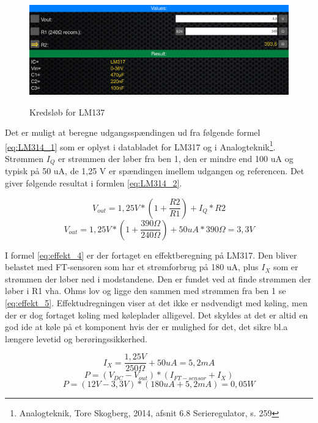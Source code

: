 \begin{figure}[H] \centering
{\includegraphics[width=\textwidth]{filer/design/Billeder/LM317_calc}}
\caption{Kredsløb for LM137}
\label{lab:LM317_calc}
\raggedright
\end{figure}

Det er muligt at beregne udgangsspændingen ud fra følgende formel \ref{eq:LM314_1} som er oplyst i databladet for LM317 og i Analogteknik\footnote{Analogteknik, Tore Skogberg, 2014, afsnit 6.8 Serieregulator, s. 259}. Strømmen $I_Q$ er strømmen der løber fra ben 1, den er mindre end 100 uA og typisk på 50 uA, de 1,25 V er spændingen imellem udgangen og referencen. Det giver følgende resultat i formlen \ref{eq:LM314_2}. 

\begin{equation} 
V_{out} = 1,25 V*(1+\frac{R2}{R1})+I_Q*R2
\label{eq:LM314_1}
\end{equation}
\begin{equation} 
V_{out} = 1,25 V*(1+\frac{390\Omega}{240\Omega})+50uA*390\Omega = 3,3 V
\label{eq:LM314_2}
\end{equation}


I formel \ref{eq:effekt_4} er der fortaget en effektberegning på LM317. Den bliver belastet med FT-sensoren som har et strømforbrug på 180 uA, plus $I_X$ som er strømmen der løber ned i modstandene. Den er fundet ved at finde strømmen der løber i R1 vha. Ohms lov og ligge den sammen med strømmen fra ben 1 se \ref{eq:effekt_5}. Effektudregningen viser at det ikke er nødvendigt med køling, men der er dog  fortaget køling med køleplader alligevel. Det skyldes at det er altid en god ide at køle på et komponent hvis der er mulighed for det, det sikre bl.a længere levetid og berøringssikkerhed.

\begin{equation} 
I_X = \frac{1,25V}{250\Omega}+50uA = 5,2 mA  
\label{eq:effekt_5}
\end{equation} 
\begin{equation} 
P = (V_{DC}-V_{out})*(I_{FT-sensor}+I_X) 
\label{eq:effekt_3}
\end{equation}
\begin{equation} 
P = (12V - 3,3V)*(180 uA +5,2 mA)= 0,05 W 
\label{eq:effekt_4}
\end{equation}


